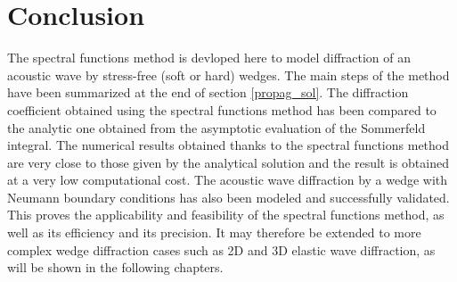 \section*{Conclusion}
The spectral functions method is devloped here to model diffraction of an acoustic wave by stress-free (soft or hard) wedges. The main steps of the method have been summarized at the end of section \ref{propag_sol}. The diffraction coefficient obtained using the spectral functions method has been compared to the analytic one obtained from the asymptotic evaluation of the Sommerfeld integral. The numerical results obtained thanks to the spectral functions method are very close to those given by the analytical solution and the result is obtained at a very low computational cost. The acoustic wave diffraction by a wedge with Neumann boundary conditions has also been modeled and successfully validated. This proves the applicability and feasibility of the spectral functions method, as well as its efficiency and its precision. It may therefore be extended to more complex wedge diffraction cases such as 2D and 3D elastic wave diffraction, as will be shown in the following chapters. 
